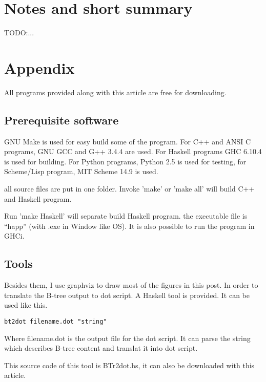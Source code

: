 \documentclass{article}
\begin{document}
\section{Notes and short summary}
TODO:...

\section{Appendix} \label{appendix}
All programs provided along with this article are free for
downloading.

\subsection{Prerequisite software}
GNU Make is used for easy build some of the program. For C++ and ANSI C programs,
GNU GCC and G++ 3.4.4 are used. 
For Haskell programs GHC 6.10.4 is used
for building. For Python programs, Python 2.5 is used for testing, for
Scheme/Lisp program, MIT Scheme 14.9 is used.

all source files are put in one folder. Invoke 'make' or 'make all'
will build C++ and Haskell program. 

Run 'make Haskell' will separate build Haskell program. the executable
file is ``happ'' (with .exe
in Window like OS). It is also possible to run the program in GHCi.

\subsection{Tools}

Besides them, I use graphviz to draw most of the figures in this post. In order to
translate the B-tree output to dot script. A Haskell tool is provided.
It can be used like this.

\begin{verbatim}
bt2dot filename.dot "string"
\end{verbatim}

Where filename.dot is the output file for the dot script. It can
parse the string which describes B-tree content and translat it 
into dot script.

This source code of this tool is BTr2dot.hs, it can also be downloaded 
with this article.
\end{document}
